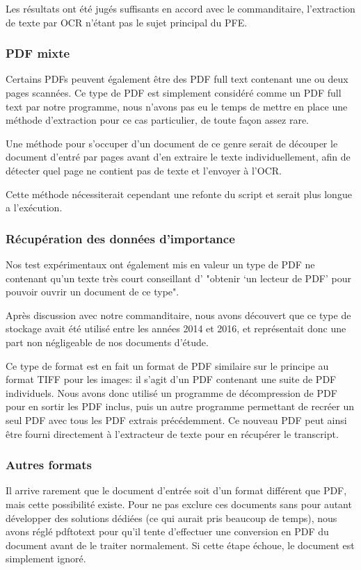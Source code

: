 Les résultats ont été jugés suffisants en accord avec le commanditaire, l'extraction de texte par OCR n'étant pas le sujet principal du PFE\@.

\subsubsection{PDF mixte}
Certains PDFs peuvent également être des PDF full text contenant une ou deux pages scannées.
Ce type de PDF est simplement considéré comme un PDF full text par notre programme, nous n'avons pas eu le temps de mettre en place une méthode d'extraction pour ce cas particulier, de toute façon assez rare.

Une méthode pour s'occuper d'un document de ce genre serait de découper le document d'entré par pages avant d'en extraire le texte individuellement, afin de détecter quel page ne contient pas de texte et l'envoyer à l'OCR\@.

Cette méthode nécessiterait cependant une refonte du script et serait plus longue a l'exécution.

\subsubsection{Récupération des données d'importance}
Nos test expérimentaux ont également mis en valeur un type de PDF ne contenant qu'un texte très court conseillant d' "obtenir `un lecteur de PDF' pour pouvoir ouvrir un document de ce type".

Après discussion avec notre commanditaire, nous avons découvert que ce type de stockage avait été utilisé entre les années 2014 et 2016, et représentait donc une part non négligeable de nos documents d'étude.

Ce type de format est en fait un format de PDF similaire sur le principe au format TIFF pour les images: il s'agit d'un PDF contenant une suite de PDF individuels.
Nous avons donc utilisé un programme de décompression de PDF pour en sortir les PDF inclus, puis un autre programme permettant de recréer un seul PDF avec tous les PDF extrais précédemment.
Ce nouveau PDF peut ainsi être fourni directement à l'extracteur de texte pour en récupérer le transcript.

\subsubsection{Autres formats}
Il arrive rarement que le document d'entrée soit d'un format différent que PDF, mais cette possibilité existe.
Pour ne pas exclure ces documents sans pour autant développer des solutions dédiées (ce qui aurait pris beaucoup de temps), nous avons réglé pdftotext pour qu'il tente d'effectuer une conversion en PDF du document avant de le traiter normalement.
Si cette étape échoue, le document est simplement ignoré.



